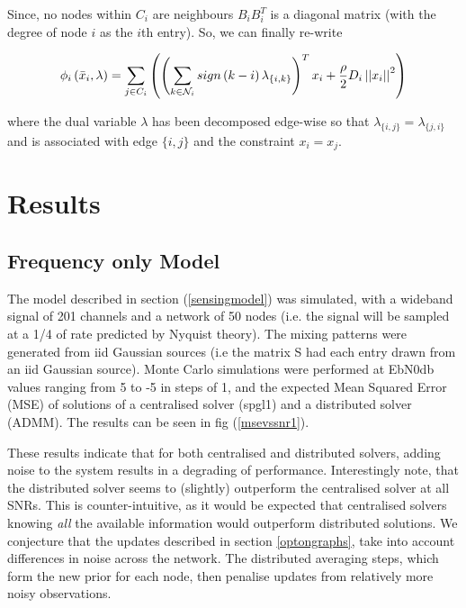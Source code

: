 \documentclass{article}
\begin{document}
Since, no nodes within \(C_i\) are neighbours \(B_iB_i^T\) is a diagonal matrix (with the degree of node \(i\) as the \(i\)th entry). So, we can finally re-write

\begin{equation}
\phi_i\left(\bar{x}_i, \lambda\right) = \sum_{j \in C_i}\left(\left(\sum_{k \in \mathcal{N}_i} sign\left(k-i\right)\lambda_{\{i,k\}}\right)^T x_i + \frac{\rho}{2}D_i\left|\left|x_i\right|\right|^2  \right)
\end{equation}

where the dual variable \(\lambda\) has been decomposed edge-wise so that \(\lambda_{\{i,j\}} = \lambda_{\{j,i\}}\) and is associated with edge \(\{i,j\}\) and the constraint \(x_i = x_j\).

\section{Results}

\subsection{Frequency only Model}

The model described in section (\ref{sensingmodel}) was simulated, with a wideband signal of 201 channels and a network of 50 nodes (i.e. the signal will be sampled at a 1/4 of rate predicted by Nyquist theory). The mixing patterns were generated from iid Gaussian sources (i.e the matrix S had each entry drawn from an iid Gaussian source). Monte Carlo simulations were performed at EbN0db values ranging from 5 to -5 in steps of 1, and the expected Mean Squared Error (MSE) of solutions of a centralised solver (spgl1) and a distributed solver (ADMM). The results can be seen in fig (\ref{msevssnr1}). 

These results indicate that for both centralised and distributed solvers, adding noise to the system results in a degrading of performance. Interestingly note, that the distributed solver seems to (slightly) outperform the centralised solver at all SNRs. This is counter-intuitive, as it would be expected that centralised solvers knowing \textit{all} the available information would outperform distributed solutions. We conjecture that the updates described in section \ref{optongraphs}, take into account differences in noise across the network. The distributed averaging steps, which form the new prior for each node, then penalise updates from relatively more noisy observations. 
\end{document}
